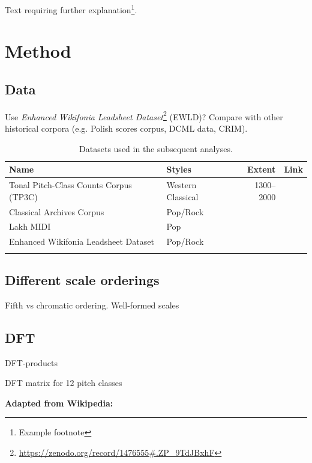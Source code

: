 \documentclass[twoside,onecolumn]{article}
\begin{document}
Text requiring further explanation\footnote{Example footnote}.

\section{Method}\label{sec:method}
\blindtext %

\subsection{Data}\label{sec:data}

Use \textit{Enhanced Wikifonia Leadsheet Dataset}\footnote{\url{https://zenodo.org/record/1476555\#.ZP_9TdJBxhF}} (EWLD)? Compare with other historical corpora (e.g. Polish scores corpus, DCML data, CRIM). 

\blindtext %

\begin{table}
\caption{Datasets used in the subsequent analyses.}
\centering
\begin{tabular}{llrr}
\toprule
Name & Styles & Extent & Link \\
\midrule
Tonal Pitch-Class Counts Corpus (TP3C) & Western Classical & 1300--2000 & \cite{tp3c}\\
Classical Archives Corpus & Pop/Rock & & \\
Lakh MIDI & Pop &  & \\
Enhanced Wikifonia Leadsheet Dataset & Pop/Rock & & \\
\bottomrule
\label{tab1}
\end{tabular}
\end{table}

\subsection{Different scale orderings}\label{subsec22}

Fifth vs chromatic ordering. Well-formed scales

\blindtext %


\subsection{DFT}

DFT-products \cite{YustAmiot:2022}

DFT matrix for 12 pitch classes

\textbf{Adapted from Wikipedia:}
\end{document}
